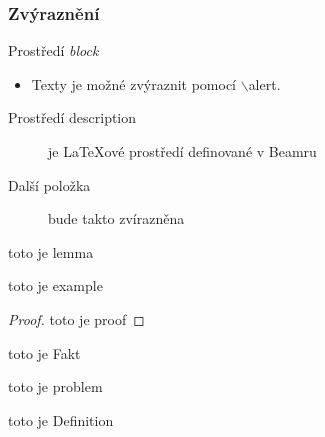 \documentclass{beamer}
\begin{document}
\begin{frame}
  \frametitle{Zvýraznění}
  \begin{block}{Prostředí \emph{block}}
    \begin{itemize}
	  \item  Texty je možné \alert{zvýraznit} pomocí $\backslash$alert.
    \end{itemize}
  \end{block}
  \vskip 1cm
  \begin{description}
	  \item[Prostředí description] je \LaTeX ové prostředí definované v Beamru
	  \item[Další položka] bude takto zvírazněna
  \end{description}

  \end{frame}

\begin{frame}
	\begin{lemma}
	toto je lemma
	\end{lemma}
	\begin{example}
	toto je example
	\end{example}
	\begin{proof}
	toto je proof
	\end{proof}
	\begin{Fakt}
	toto je Fakt
	\end{Fakt}
	\begin{problem}
	toto je problem
	\end{problem}
	\begin{Definition}
	toto je Definition
	\end{Definition}
\end{frame}
\end{document}
